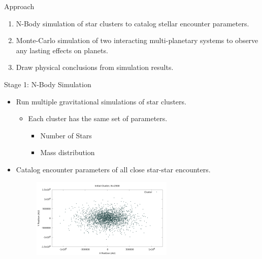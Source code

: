 \documentclass{beamer}
\begin{document}
\begin{frame}{Approach}
    \begin{enumerate}
        \item N-Body simulation of star clusters to catalog stellar encounter parameters.
        \item Monte-Carlo simulation of two interacting multi-planetary systems 
            to observe any lasting effects on planets.
        \item Draw physical conclusions from simulation results.
    \end{enumerate}
\end{frame}

\begin{frame}{Stage 1: N-Body Simulation}
    \begin{itemize}
        \item Run multiple gravitational simulations of star clusters.
            \begin{itemize}
                \item Each cluster has the same set of parameters.
                \begin{itemize}
                    \item Number of Stars
                    \item Mass distribution
                \end{itemize}
            \end{itemize}
        \item Catalog encounter parameters of all close star-star encounters.
        \begin{figure}
            \includegraphics[height=1.5in]{cluster1.png}
        \end{figure}
    \end{itemize}
\end{frame}
\end{document}
